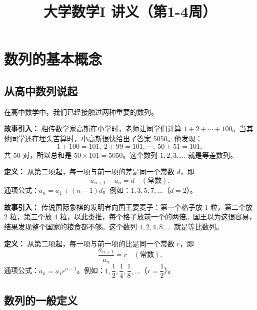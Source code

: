 \documentclass{ctexart}
\title{大学数学I 讲义（第1-4周）}
\author{}
\date{}
\begin{document}
\maketitle
{}
\renewcommand{\contentsname}{\hspace*{\fill}\Large\bfseries 目\quad 录 \hspace*{\fill}}
\setcounter{tocdepth}{2}
\tableofcontents 
\clearpage
\pagestyle{fancy}

\section{数列的基本概念}

\subsection{从高中数列说起}

在高中数学中，我们已经接触过两种重要的数列。

\begin{example}[等差数列]


\textbf{故事引入：} 相传数学家高斯在小学时，老师让同学们计算 \(1 + 2 + \cdots + 100\)。当其他同学还在埋头苦算时，小高斯很快给出了答案 5050。他发现：
\[
1+100=101,\ 2+99=101,\ \cdots,\ 50+51=101,
\]
共 50 对，所以总和是 \(50 \times 101 = 5050\)。这个数列 \(1,2,3,\dots\) 就是等差数列。

\textbf{定义：} 从第二项起，每一项与前一项的差是同一个常数 \(d\)，即
\[
a_{n+1} - a_n = d \quad (\text{常数}).
\]
通项公式：\(a_n = a_1 + (n-1)d\)。例如：\(1,3,5,7,\dots\)（\(d=2\)）。
\end{example}

\begin{example}[等比数列]


\textbf{故事引入：} 传说国际象棋的发明者向国王要麦子：第一个格子放 1 粒，第二个放 2 粒，第三个放 4 粒，以此类推，每个格子放前一个的两倍。国王以为这很容易，结果发现整个国家的粮食都不够。这个数列 \(1,2,4,8,\dots\) 就是等比数列。

\textbf{定义：} 从第二项起，每一项与前一项的比是同一个常数 \(r\)，即
\[
\dfrac{a_{n+1}}{a_n} = r \quad (\text{常数}).
\]
通项公式：\(a_n = a_1 r^{n-1}\)。例如：\(1,\dfrac12,\dfrac14,\dfrac18,\dots\)（\(r=\dfrac12\)）。
\end{example}

\subsection{数列的一般定义}
\end{document}
